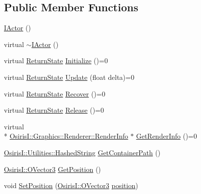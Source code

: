 \subsection*{Public Member Functions}
\begin{DoxyCompactItemize}
\item 
\hyperlink{class_osiris_i_1_1_graphics_1_1_actors_1_1_i_actor_aee2db27c96f5069b9692f41e4df3c7ac}{I\-Actor} ()
\item 
virtual \hyperlink{class_osiris_i_1_1_graphics_1_1_actors_1_1_i_actor_a2c3d1fb4f07ab0b7b8650ca3ede8b775}{$\sim$\-I\-Actor} ()
\item 
virtual \hyperlink{namespace_osiris_i_a8f53bf938dc75c65c6a529694514013e}{Return\-State} \hyperlink{class_osiris_i_1_1_graphics_1_1_actors_1_1_i_actor_aad96c09eee7f3e0082986efc68520e02}{Initialize} ()=0
\item 
virtual \hyperlink{namespace_osiris_i_a8f53bf938dc75c65c6a529694514013e}{Return\-State} \hyperlink{class_osiris_i_1_1_graphics_1_1_actors_1_1_i_actor_af0baf4bd4e739f74bb11b8871d71ba85}{Update} (float delta)=0
\item 
virtual \hyperlink{namespace_osiris_i_a8f53bf938dc75c65c6a529694514013e}{Return\-State} \hyperlink{class_osiris_i_1_1_graphics_1_1_actors_1_1_i_actor_aede25f8ef9e557bc72fcb034eaea23cd}{Recover} ()=0
\item 
virtual \hyperlink{namespace_osiris_i_a8f53bf938dc75c65c6a529694514013e}{Return\-State} \hyperlink{class_osiris_i_1_1_graphics_1_1_actors_1_1_i_actor_a507a1f5e1879c0d8a9a4a29c9bd7c411}{Release} ()=0
\item 
virtual \\*
\hyperlink{struct_osiris_i_1_1_graphics_1_1_renderer_1_1_render_info}{Osiris\-I\-::\-Graphics\-::\-Renderer\-::\-Render\-Info} $\ast$ \hyperlink{class_osiris_i_1_1_graphics_1_1_actors_1_1_i_actor_acce361bfc1dc81963d41961020953938}{Get\-Render\-Info} ()=0
\item 
\hyperlink{class_osiris_i_1_1_utilities_1_1_hashed_string}{Osiris\-I\-::\-Utilities\-::\-Hashed\-String} \hyperlink{class_osiris_i_1_1_graphics_1_1_actors_1_1_i_actor_a7ed212f9465077ba922fe0b4ed631012}{Get\-Container\-Path} ()
\item 
\hyperlink{struct_osiris_i_1_1_o_vector3}{Osiris\-I\-::\-O\-Vector3} \hyperlink{class_osiris_i_1_1_graphics_1_1_actors_1_1_i_actor_a3f4d29a08c86f3696711a15fc30f39fb}{Get\-Position} ()
\item 
void \hyperlink{class_osiris_i_1_1_graphics_1_1_actors_1_1_i_actor_a170dd0543944ef87e552ba9abb61dd5f}{Set\-Position} (\hyperlink{struct_osiris_i_1_1_o_vector3}{Osiris\-I\-::\-O\-Vector3} \hyperlink{class_osiris_i_1_1_graphics_1_1_actors_1_1_i_actor_aee6ea81df284578ca63a186a03dd3bcc}{position})

\end{DoxyCompactItemize}
